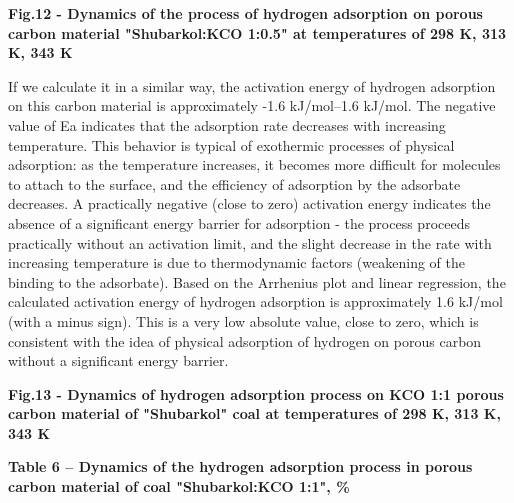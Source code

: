 {\bfseries Fig.12 - Dynamics of the process of hydrogen adsorption on
porous carbon material "Shubarkol:KCO
1:0.5" at temperatures of 298 K, \hspace{0pt}\hspace{0pt}313 K, 343 K}

If we calculate it in a similar way, the activation energy of hydrogen
adsorption on this carbon material is approximately -1.6 kJ/mol--1.6
kJ/mol. The negative value of Ea indicates that the adsorption rate
decreases with increasing temperature. This behavior is typical of
exothermic processes of physical adsorption: as the temperature
increases, it becomes more difficult for molecules to attach to the
surface, and the efficiency of adsorption by the adsorbate decreases. A
practically negative (close to zero) activation energy indicates the
absence of a significant energy barrier for adsorption - the process
proceeds practically without an activation limit, and the slight
decrease in the rate with increasing temperature is due to thermodynamic
factors (weakening of the binding to the adsorbate). Based on the
Arrhenius plot and linear regression, the calculated activation energy
of hydrogen adsorption is approximately 1.6 kJ/mol (with a minus sign).
This is a very low absolute value, close to zero, which is consistent
with the idea of \hspace{0pt}\hspace{0pt}physical adsorption of hydrogen
on porous carbon without a significant energy barrier.


{\bfseries Fig.13 - Dynamics of hydrogen adsorption process on
KCO 1:1 porous carbon material of
"Shubarkol" coal at temperatures of 298 K, 313 K, 343 K}

{\bfseries Table 6 -- Dynamics of the hydrogen adsorption process in porous
carbon material of coal "Shubarkol:KCO
1:1", \%}

